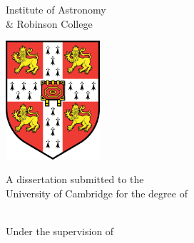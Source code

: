 \begin{titlepage}
    \begin{addmargin}[-1cm]{-3cm}
    \begin{center}

        \large

        \hfill

        \vfill

        \begingroup
            \color{Maroon}\LARGE{\spacedallcaps{\myTitle}} \\ \bigskip
        \endgroup

        \vspace{2cm}

        {\LARGE \spacedallcaps{\myName}} \\
        {\Large Institute of Astronomy  \\
         \& Robinson College} \\

        \vfill

        \includegraphics[width=3.5cm]{figures/Cambridge_University_Crest_-_flat.png} \\ \medskip

        \vspace{1cm}

        A dissertation submitted to the \\
        University of Cambridge for the degree of \\
        {\Large {}} \\ \bigskip

        \vspace{1cm}

        Under the supervision of \\
        {\Large {} \\
         } \\


\end{center}
\end{addmargin}
\end{titlepage}
